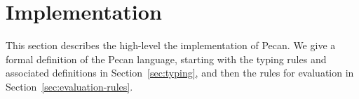 \section{Implementation}\label{sec:implementation}

This section describes the high-level the implementation of Pecan.
We give a formal definition of the Pecan language, starting with the typing rules and associated definitions in Section~\ref{sec:typing}, and then the rules for evaluation in Section~\ref{sec:evaluation-rules}.




